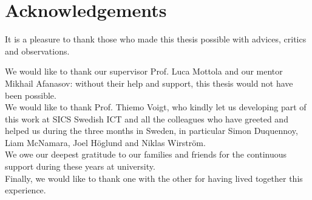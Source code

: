 \chapter*{Acknowledgements}


\noindent
It is a pleasure to thank those who made this thesis possible with advices, critics and observations.

\noindent
We would like to thank our supervisor Prof. Luca Mottola and our mentor Mikhail Afanasov: without their help and support, this thesis would not have been possible.\\

\noindent
We would like to thank Prof. Thiemo Voigt, who kindly let us developing part of this work at SICS Swedish ICT and all the colleagues who have greeted and helped us during the three months in Sweden, in particular Simon Duquennoy, Liam McNamara, Joel Höglund and Niklas Wirström.\\

\noindent
We owe our deepest gratitude to our families and friends for the continuous support during these years at university.\\

\noindent
Finally, we would like to thank one with the other for having lived together this experience.\\